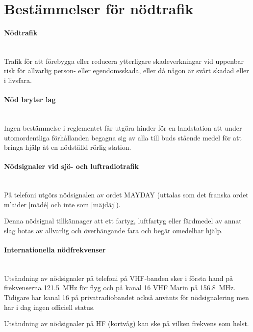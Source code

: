 \section{Bestämmelser för nödtrafik}



\paragraph{Nödtrafik} \hfill \\

Trafik för att förebygga eller reducera ytterligare
skadeverkningar vid uppenbar risk för allvarlig person- eller
egendomsskada, eller då någon är svårt skadad eller i livsfara.

\paragraph{Nöd bryter lag} \hfill \\

Ingen bestämmelse i reglementet får utgöra hinder för en landstation
att under utomordentliga förhållanden begagna sig av alla till buds
stående medel för att bringa hjälp åt en nödställd rörlig station.


\paragraph{Nödsignaler vid sjö- och luftradiotrafik} \hfill \\

På telefoni utgörs nödsignalen av ordet MAYDAY (uttalas som det
franska ordet m'aider [mädé] och inte som [mäjdäj]).

Denna nödsignal tillkännager att ett fartyg, luftfartyg eller
färdmedel av annat slag hotas av allvarlig och överhängande fara och
begär omedelbar hjälp.

\paragraph{Internationella nödfrekvenser} \hfill \\

Utsändning av nödsignaler på telefoni på VHF-banden sker i första hand
på frekvenserna \SI{121,5}{MHz} för flyg och på kanal 16 VHF Marin på
\SI{156,8}{MHz}. Tidigare har kanal 16 på privatradiobandet också
använts för nödsignalering men har i dag ingen officiell status.

Utsändning av nödsignaler på HF (kortvåg) kan ske på vilken frekvens
som helst. 


